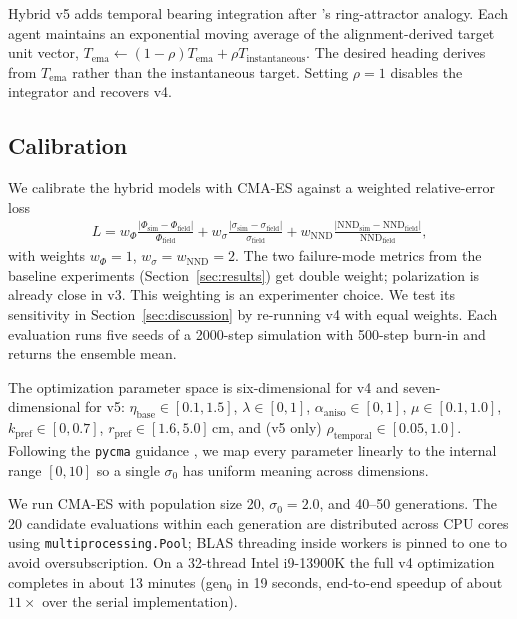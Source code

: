 \documentclass[11pt]{article}
\begin{document}
Hybrid v5 adds temporal bearing integration after \citet{sayin2025}'s
ring-attractor analogy. Each agent maintains an exponential moving
average of the alignment-derived target unit vector, $T_\text{ema}
\leftarrow (1-\rho) T_\text{ema} + \rho T_\text{instantaneous}$. The
desired heading derives from $T_\text{ema}$ rather than the
instantaneous target. Setting $\rho = 1$ disables the integrator and
recovers v4.

\subsection{Calibration}

We calibrate the hybrid models with CMA-ES against a weighted
relative-error loss
\begin{align}
L = w_\Phi \frac{|\Phi_\text{sim} - \Phi_\text{field}|}{\Phi_\text{field}}
  + w_\sigma \frac{|\sigma_\text{sim} - \sigma_\text{field}|}{\sigma_\text{field}}
  + w_\text{NND} \frac{|\text{NND}_\text{sim} - \text{NND}_\text{field}|}{\text{NND}_\text{field}},
\end{align}
with weights $w_\Phi = 1$, $w_\sigma = w_\text{NND} = 2$. The two
failure-mode metrics from the baseline experiments
(Section~\ref{sec:results}) get double weight; polarization is already
close in v3. This weighting is an experimenter choice. We test its
sensitivity in Section~\ref{sec:discussion} by re-running v4 with equal
weights. Each evaluation runs five seeds of a 2000-step simulation with
500-step burn-in and returns the ensemble mean.

The optimization parameter space is six-dimensional for v4 and
seven-dimensional for v5: $\eta_\text{base} \in [0.1, 1.5]$,
$\lambda \in [0, 1]$, $\alpha_\text{aniso} \in [0, 1]$,
$\mu \in [0.1, 1.0]$, $k_\text{pref} \in [0, 0.7]$,
$r_\text{pref} \in [1.6, 5.0]$\,cm, and (v5 only)
$\rho_\text{temporal} \in [0.05, 1.0]$. Following the \texttt{pycma}
guidance \citep{pycma}, we map every parameter linearly to the internal
range $[0, 10]$ so a single $\sigma_0$ has uniform meaning across
dimensions.

We run CMA-ES with population size 20, $\sigma_0 = 2.0$, and 40--50
generations. The 20 candidate evaluations within each generation are
distributed across CPU cores using \texttt{multiprocessing.Pool}; BLAS
threading inside workers is pinned to one to avoid oversubscription. On
a 32-thread Intel i9-13900K the full v4 optimization completes in
about 13 minutes (gen$_0$ in 19 seconds, end-to-end speedup of about
$11{\times}$ over the serial implementation).
\end{document}
